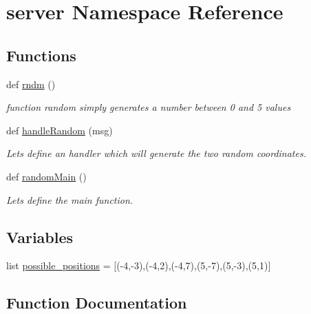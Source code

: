 \hypertarget{namespaceserver}{}\section{server Namespace Reference}
\label{namespaceserver}
\subsection*{Functions}
\begin{DoxyCompactItemize}
\item 
def \hyperlink{namespaceserver_a902741955d8bc8d124b63e5e36451576}{rndm} ()
\begin{DoxyCompactList}\small\item\em function random simply generates a number between 0 and 5 values \end{DoxyCompactList}\item 
def \hyperlink{namespaceserver_aafe6fc2dad8c098dfaf6d332119893dd}{handle\+Random} (msg)
\begin{DoxyCompactList}\small\item\em Let\textquotesingle{}s define an handler which will generate the two random coordinates. \end{DoxyCompactList}\item 
def \hyperlink{namespaceserver_a1032eb6dc59913e1baf09e9c0bd65cbf}{random\+Main} ()
\begin{DoxyCompactList}\small\item\em Let\textquotesingle{}s define the main function. \end{DoxyCompactList}\end{DoxyCompactItemize}
\subsection*{Variables}
\begin{DoxyCompactItemize}
\item 
list \hyperlink{namespaceserver_a44225ce840223e3bbc4ec0e8cd921add}{possible\+\_\+positions} = \mbox{[}(-\/4,-\/3),(-\/4,2),(-\/4,7),(5,-\/7),(5,-\/3),(5,1)\mbox{]}
\end{DoxyCompactItemize}


\subsection{Function Documentation}
\mbox{\label{namespaceserver_aafe6fc2dad8c098dfaf6d332119893dd}} 
